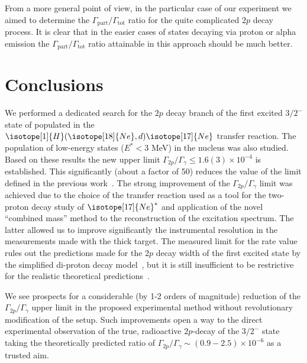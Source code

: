 \documentclass[superscriptaddress,showpacs,showkeys,twoside,floatfix,twocolumn]
{revtex4-1}
\begin{document}
From a more general point of view, in the particular case of our experiment
we aimed to determine the $\Gamma_{\mathrm{part}}/\Gamma_{\mathrm{tot}}$ ratio
for the quite complicated $2p$ decay process.
It is clear that in the easier cases of states decaying via proton or
alpha emission the $\Gamma_{\mathrm{part}}/\Gamma_{\mathrm{tot}}$ ratio
attainable in this approach should be much better.




\section{Conclusions}


We performed a dedicated search for the $2p$ decay branch of the first excited
$3/2^-$ state of  populated in the
$\isotope[1]{H}(\isotope[18]{Ne},d)\isotope[17]{Ne}$ transfer reaction.
The population of low-energy states (\(E^* < 3\) MeV)
in the  nucleus was also studied.
Based on these results the new upper limit
$\Gamma_{2p}/\Gamma_{\gamma} \leq 1.6(3) \times 10^{-4}$ is established.
This significantly (about a factor of 50) reduces the value of the limit defined
in the previous work~\cite{Chromik:2002}.
The strong improvement of the $\Gamma_{2p}/\Gamma_{\gamma}$ limit was achieved
due to the choice of the transfer reaction used
as a tool for the two-proton decay study of \(\isotope[17]{Ne}^*\) and
application of the novel ``combined mass'' method to the reconstruction of
the  excitation spectrum.
The latter allowed us to improve significantly the instrumental resolution in
the measurements made with the thick target.
The measured limit for the rate value rules out the predictions made for
the $2p$ decay width of the  first excited state
by the simplified di-proton decay model~\cite{Chromik:1997},
 but it is still insufficient to be restrictive
for the realistic theoretical predictions~\cite{Grigorenko:2007,Garrido:2008}.


We see prospects for a considerable (by 1-2 orders of magnitude) reduction of
the $\Gamma_{2p}/\Gamma_{\gamma}$ upper limit in the proposed experimental method
without revolutionary modification of the setup.
Such improvements open a way to the direct experimental observation of the true,
radioactive $2p$-decay of the  $3/2^-$ state taking
the theoretically predicted ratio of
$\Gamma_{2p}/\Gamma_{\gamma} \sim (0.9-2.5) \times 10^{-6}$ as a trusted aim.
\end{document}
